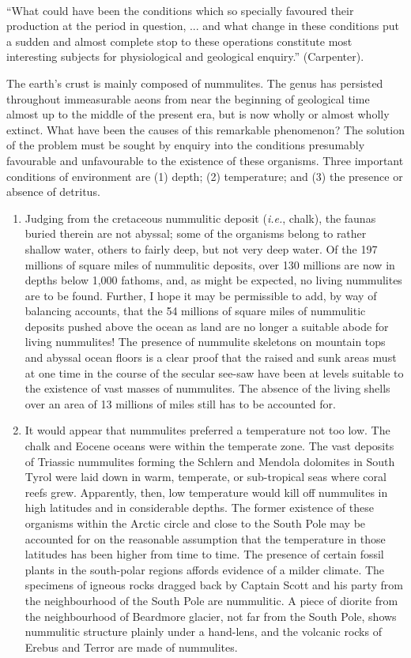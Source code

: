 \documentclass[a4paper, 12pt, oneside]{article}
\begin{document}
\paragraph{}
``What could have been the conditions which so specially favoured their production at the period in question, ... and what change in these conditions put a sudden and almost complete stop to these operations constitute most interesting subjects for physiological and geological enquiry.'' (Carpenter).

The earth's crust is mainly composed of nummulites. The genus has persisted throughout immeasurable aeons from near the beginning of geological time almost up to the middle of the present era, but is now wholly or almost wholly extinct. What have been the causes of this remarkable phenomenon? The solution of the problem must be sought by enquiry into the conditions presumably favourable and unfavourable to the existence of these organisms. Three important conditions of environment are (1) depth; (2) temperature; and (3) the presence or absence of detritus.
\begin{enumerate}
    \item Judging from the cretaceous nummulitic deposit (\emph{i.e.}, chalk), the faunas buried therein are not abyssal; some of the organisms belong to rather shallow water, others to fairly deep, but not very deep water. Of the 197 millions of square miles of nummulitic deposits, over 130 millions are now in depths below 1,000 fathoms, and, as might be expected, no living nummulites are to be found. Further, I hope it may be permissible to add, by way of balancing accounts, that the 54 millions of square miles of nummulitic deposits pushed above the ocean as land are no longer a suitable abode for living nummulites! The presence of nummulite skeletons on mountain tops and abyssal ocean floors is a clear proof that the raised and sunk areas must at one time in the course of the secular see-saw have been at levels suitable to the existence of vast masses of nummulites. The absence of the living shells over an area of 13 millions of miles still has to be accounted for.
    \item It would appear that nummulites preferred a temperature not too low. The chalk and Eocene oceans were within the temperate zone. The vast deposits of Triassic nummulites forming the Schlern and Mendola dolomites in South Tyrol were laid down in warm, temperate, or sub-tropical seas where coral reefs grew. Apparently, then, low temperature would kill off nummulites in high latitudes and in considerable depths. The former existence of these organisms within the Arctic circle and close to the South Pole may be accounted for on the reasonable assumption that the temperature in those latitudes has been higher from time to time. The presence of certain fossil plants in the south-polar regions affords evidence of a milder climate. The specimens of igneous rocks dragged back by Captain Scott and his party from the neighbourhood of the South Pole are nummulitic. A piece of diorite from the neighbourhood of Beardmore glacier, not far from the South Pole, shows nummulitic structure plainly under a hand-lens, and the volcanic rocks of Erebus and Terror are made of nummulites.
\end{enumerate}
\end{document}
